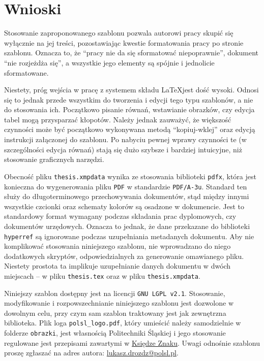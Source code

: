 \chapter{Wnioski}

Stosowanie zaproponowanego szablonu pozwala autorowi pracy skupić się wyłącznie na jej treści, pozostawiając kwestie formatowania pracy po stronie szablonu. Oznacza to, że \enquote{pracy nie da się sformatować niepoprawnie}, dokument \enquote{nie rozjeżdża się}, a wszystkie jego elementy są spójnie i jednolicie sformatowane.

Niestety, próg wejścia w pracę z systemem składu \LaTeX jest dość wysoki. Odnosi się to jednak przede wszystkim do tworzenia i edycji tego typu szablonów, a nie do stosowania ich. Początkowo pisanie równań, wstawianie obrazków, czy edycja tabel mogą przysparzać kłopotów. Należy jednak zauważyć, że większość czynności może być początkowo wykonywana metodą \enquote{kopiuj-wklej} oraz edycją instrukcji załączonej do szablonu. Po nabyciu pewnej wprawy czynności te (w szczególności edycja równań) stają się dużo szybsze i bardziej intuicyjne, niż stosowanie graficznych narzędzi.

Obecność pliku \verb|thesis.xmpdata| wynika ze stosowania biblioteki \verb|pdfx|, która jest konieczna do wygenerowania pliku \verb|PDF| w standardzie \verb|PDF/A-3u|. Standard ten służy do długoterminowego przechowywania dokumentów, stąd między innymi wszystkie czcionki oraz schematy kolorów są osadzone w dokumencie. Jest to standardowy format wymagany podczas składania prac dyplomowych, czy dokumentów urzędowych. Oznacza to jednak, że dane przekazane do biblioteki \verb|hyperref| są ignorowane podczas uzupełniania metadanych dokumentu. Aby nie komplikować stosowania niniejszego szablonu, nie wprowadzano do niego dodatkowych skryptów, odpowiedzialnych za generowanie omawianego pliku. Niestety prostota ta implikuje uzupełnianie danych dokumentu w dwóch miejscach -- w pliku \verb|thesis.tex| oraz w pliku \verb|thesis.xmpdata|.

Niniejszy szablon dostępny jest na licencji \verb|GNU LGPL v2.1|. Stosowanie, modyfikowanie i rozpowszechnianie niniejszego szablonu jest dozwolone w dowolnym celu, przy czym sam szablon traktowany jest jak zewnętrzna biblioteka. Plik loga \verb|polsl_logo.pdf|, który umieścić należy samodzielnie w folderze \verb|obrazki|, jest własnością Politechniki Śląskiej i jego stosowanie regulowane jest przepisami zawartymi w \href{https://www.polsl.pl/siwps/logo-2/}{Księdze Znaku}. Uwagi odnośnie szablonu proszę zgłaszać na adres autora: \href{mailto:lukasz.drozdz@polsl.pl}{lukasz.drozdz@polsl.pl}.
